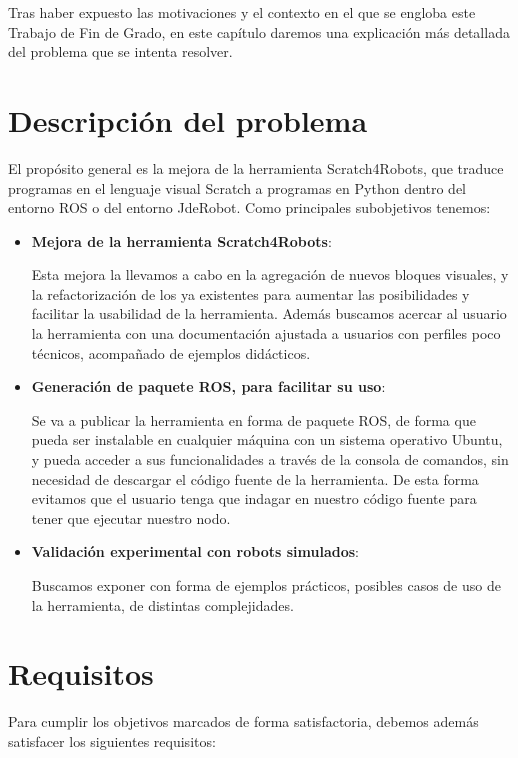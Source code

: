 Tras haber expuesto las motivaciones y el contexto en el que se engloba este Trabajo de Fin de Grado, en este capítulo daremos una explicación más detallada del problema que se
intenta resolver.


\section{Descripción del problema}
\label{sec:descripcion del problema}
El propósito general es la mejora de la herramienta Scratch4Robots, que traduce programas en el lenguaje visual Scratch a programas en Python dentro del entorno ROS o del entorno JdeRobot. Como principales subobjetivos tenemos:
\begin{itemize}
\item \textbf{Mejora de la herramienta Scratch4Robots}:

Esta mejora la llevamos a cabo en la agregación de nuevos bloques visuales, y la refactorización de los ya existentes para aumentar las posibilidades y facilitar la usabilidad de la herramienta. Además buscamos acercar al usuario la herramienta con una documentación ajustada a usuarios con perfiles poco técnicos, acompañado de ejemplos didácticos.

\item \textbf{Generación de paquete ROS, para
facilitar su uso}:

Se va a publicar la herramienta en forma de paquete ROS, de forma que pueda ser instalable en cualquier máquina con un sistema operativo Ubuntu, y pueda acceder a sus funcionalidades a través de la consola de comandos, sin necesidad de descargar el código fuente de la herramienta. De esta forma evitamos que el usuario tenga que indagar en nuestro código fuente para tener que ejecutar nuestro nodo.

\item \textbf{Validación experimental con robots simulados}:

Buscamos exponer con forma de ejemplos prácticos, posibles casos de uso de la herramienta, de distintas complejidades.
\end{itemize}


\section{Requisitos}
\label{sec:requisitos}

Para cumplir los objetivos marcados de forma satisfactoria, debemos además satisfacer
los siguientes requisitos:

